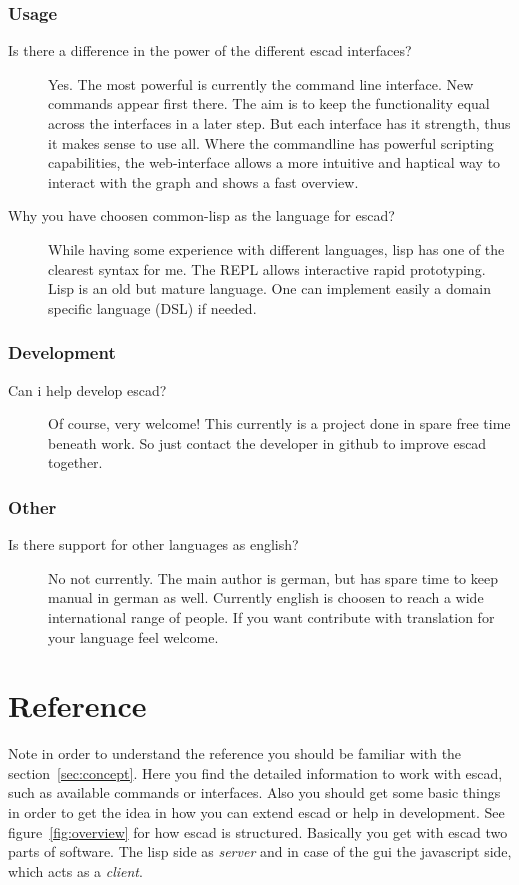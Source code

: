 \documentclass[a4paper, 12pt, openany]{scrbook}
\begin{document}
\subsection{Usage}
\begin{description}
\item[Is there a difference in the power of the different escad interfaces?] Yes. The most powerful is currently the command line interface. New commands appear first there. The aim is to keep the functionality equal across the interfaces in a later step. But each interface has it strength, thus it makes sense to use all. Where the commandline has powerful scripting capabilities, the web-interface allows a more intuitive and haptical way to interact with the graph and shows a fast overview.
\item[Why you have choosen common-lisp as the language for escad?] While having some experience with different languages, lisp has one of the clearest syntax for me. The REPL allows interactive rapid prototyping. Lisp is an old but mature language. One can implement easily a domain specific language (DSL) if needed.
\end{description}
\subsection{Development}
\begin{description}
\item[Can i help develop escad?] Of course, very welcome! This currently is a project done in spare free time beneath work. So just contact the developer in github to improve escad together.
\end{description}
\subsection{Other}
\begin{description}
\item[Is there support for other languages as english?]  No not currently. The main author is german, but has spare time to keep manual in german as well. Currently english is choosen to reach a wide international range of people. If you want contribute with translation for your language feel welcome.
\end{description}
\chapter{Reference}
Note in order to understand the reference you should be familiar with the section~\ref{sec:concept}. Here you find the detailed information to work with escad, such as available commands or interfaces. Also you should get some basic things in order to get the idea in how you can extend escad or help in development.
See figure~\ref{fig:overview} for how escad is structured. Basically you get with escad two parts of software. The lisp side as \emph{server} and in case of the gui the javascript side, which acts as a \emph{client}.
\end{document}
